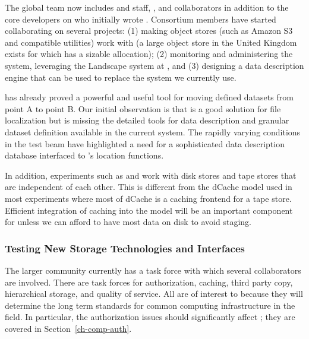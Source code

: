 The global  team now includes  and  staff, , and  collaborators  in addition to the core developers on  who initially wrote .  Consortium members have started collaborating on several projects:  (1) making object stores (such as Amazon S3 and compatible utilities) work with  (a large object store in the United Kingdom exists for which  has a sizable allocation);  (2) monitoring  and administering the  system, leveraging the Landscape system at , and  (3) designing a  data description engine that can be used to replace the  system we currently use.



 has already proved a powerful and useful tool for moving defined datasets from point A to point B.  Our initial observation is that  is a good solution for file localization but is missing the detailed tools for data description and granular dataset definition available in the current  system.  The rapidly varying conditions in the test beam have highlighted a need for a sophisticated data description database interfaced to 's location functions. 

In addition,    experiments such as  and  work with disk stores and tape stores that are independent of each other.  This is different from the dCache model used in most  experiments where most of dCache is a caching frontend for a tape store.  Efficient integration of caching into the  model will be an important component for  unless  we can afford to have most data on disk to avoid staging.



\subsubsection{Testing New Storage Technologies and Interfaces}

The larger  community\cite{Berzano:2018xaa} currently has a  task force
 with which several  collaborators are involved. There are task forces for authorization, caching, third party copy, hierarchical storage, and quality of service. All are of interest to  because they will determine the long term standards for common computing infrastructure in the field. 
In particular, the authorization issues should significantly affect ; they are covered in Section~\ref{ch-comp-auth}.



